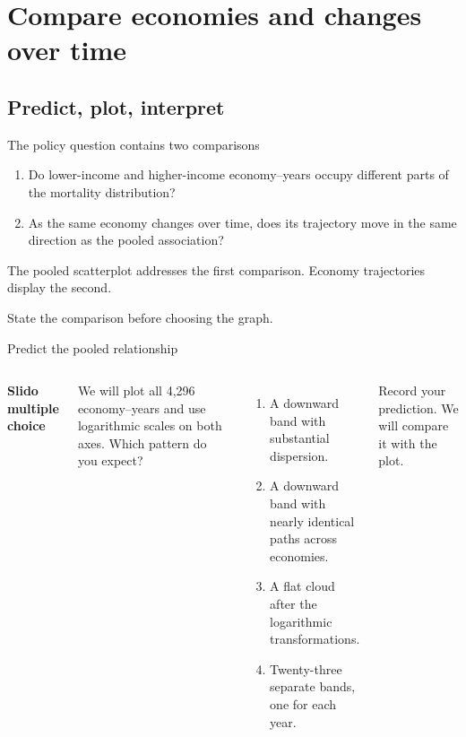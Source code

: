 \section{Compare economies and changes over time}
\subsection{Predict, plot, interpret}

\begin{frame}{The policy question contains two comparisons}
  \begin{enumerate}
    \item Do lower-income and higher-income economy--years occupy different
      parts of the mortality distribution?
    \item As the same economy changes over time, does its trajectory move in
      the same direction as the pooled association?
  \end{enumerate}

  \vspace{0.7em}
  The pooled scatterplot addresses the first comparison. Economy trajectories
  display the second.

  \vfill
  State the comparison before choosing the graph.
\end{frame}

\begin{frame}{Predict the pooled relationship}
  \begin{columns}[T,onlytextwidth]
      \textbf{Slido multiple choice}

      We will plot all 4,296 economy--years and use logarithmic scales on both
      axes. Which pattern do you expect?
      \begin{enumerate}
        \item A downward band with substantial dispersion.
        \item A downward band with nearly identical paths across economies.
        \item A flat cloud after the logarithmic transformations.
        \item Twenty-three separate bands, one for each year.
      \end{enumerate}

      \vspace{0.25em}
      Record your prediction. We will compare it with the plot.
      
  \end{columns}
\end{frame}

